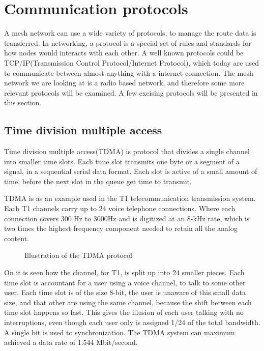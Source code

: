 \section{Communication protocols}
A mesh network can use a wide variety of protocols, to manage the route data is transferred.
In networking, a protocol is a special set of rules and standards for how nodes would interacts with each other.
A well known protocols could be TCP/IP(Transmission Control Protocol/Internet Protocol), which today are used to communicate between almost anything with a internet connection.
The mesh network we are looking at is a radio based network, and therefore some more relevant protocols will be examined. 
A few excising protocols will be presented in this section.

\subsection{Time division multiple access}
Time division multiple access(TDMA) is protocol that divides a single channel into smaller time slots.
Each time slot transmits one byte or a segment of a signal, in a sequential serial data format.
Each slot is active of a small amount of time, before the next slot in the queue get time to transmit\cite{TDMA}.

TDMA is as an example used in the T1 telecommunication transmission system.
Each T1 channels carry up to 24 voice telephone connections.
Where each connection covers 300 Hz to 3000Hz and is digitized at an 8-kHz rate, which is two times the highest frequency component needed to retain all the analog content.
\begin{figure}[!h]
	\centering
	\caption{Illustration of the TDMA protocol}
	\label{fig:TDMAfigure}
\end{figure}

On  it is seen how the channel, for T1, is split up into 24 smaller pieces.
Each time slot is accountant for a user using a voice channel, to talk to some other user.
Each time slot is of the size 8-bit, the user is unaware of this small data size, and that other are using the same channel, because the shift between each time slot happens so fast.
This gives the illusion of each user talking with no interruptions, even though each user only is assigned 1/24 of the total bandwidth.
A single bit is used to synchronization.
The TDMA system can maximum achieved a data rate of 1.544 Mbit/second\cite{TDMA}.

